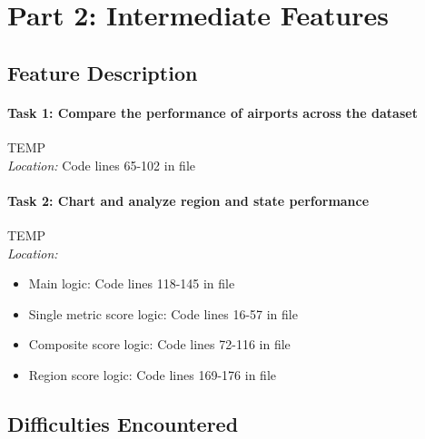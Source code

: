 \section{Part 2: Intermediate Features}

\subsection{Feature Description}

\paragraph{Task 1: Compare the performance of airports across the dataset} TEMP\\

\noindent \textit{Location:} Code lines 65-102 in file 

\paragraph{Task 2: Chart and analyze region and state performance} TEMP\\

\noindent \textit{Location:} 
  \begin{itemize}
    \item Main logic: Code lines 118-145 in file 
    \item Single metric score logic: Code lines 16-57 in file 
    \item Composite score logic: Code lines 72-116 in file 
    \item Region score logic: Code lines 169-176 in file 
  \end{itemize}

\subsection{Difficulties Encountered}
